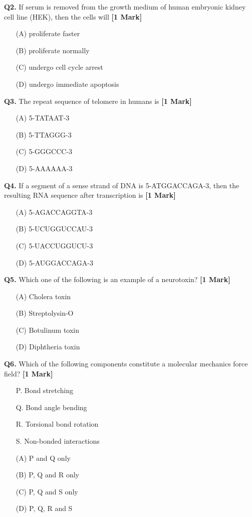 \documentclass[11pt]{article}
\newcommand{\questiona}[2]{
    \noindent\textbf{Q#2.} #1 \hfill \textbf{[1 Mark]}
}
\begin{document}
\questiona{If serum is removed from the growth medium of human embryonic kidney cell line (HEK), then the cells will}{2}
\begin{enumerate}
    \item[(A)] proliferate faster  
    \item[(B)] proliferate normally  
    \item[(C)] undergo cell cycle arrest  
    \item[(D)] undergo immediate apoptosis  
\end{enumerate}
\vspace{0.5cm}

\questiona{The repeat sequence of telomere in humans is}{3}
\begin{enumerate}
    \item[(A)] 5-TATAAT-3 
    \item[(B)] 5-TTAGGG-3
    \item[(C)] 5-GGGCCC-3  
    \item[(D)] 5-AAAAAA-3
\end{enumerate}
\vspace{0.5cm}

\questiona{If a segment of a sense strand of DNA is 5-ATGGACCAGA-3, then the resulting RNA sequence after transcription is}{4}
\begin{enumerate}
    \item[(A)] 5-AGACCAGGTA-3  
    \item[(B)] 5-UCUGGUCCAU-3  
    \item[(C)] 5-UACCUGGUCU-3  
    \item[(D)] 5-AUGGACCAGA-3 
\end{enumerate}
\vspace{0.5cm}

\questiona{Which one of the following is an example of a neurotoxin?}{5}
\begin{enumerate}
    \item[(A)] Cholera toxin  
    \item[(B)] Streptolysin-O  
    \item[(C)] Botulinum toxin  
    \item[(D)] Diphtheria toxin  
\end{enumerate}
\vspace{0.5cm}

\questiona{Which of the following components constitute a molecular mechanics force field?}{6}
\begin{enumerate}
    \item[P.] Bond stretching  
    \item[Q.] Bond angle bending  
    \item[R.] Torsional bond rotation  
    \item[S.] Non-bonded interactions  
    \item[(A)] P and Q only  
    \item[(B)] P, Q and R only  
    \item[(C)] P, Q and S only  
    \item[(D)] P, Q, R and S  
\end{enumerate}
\vspace{0.5cm}
\end{document}
